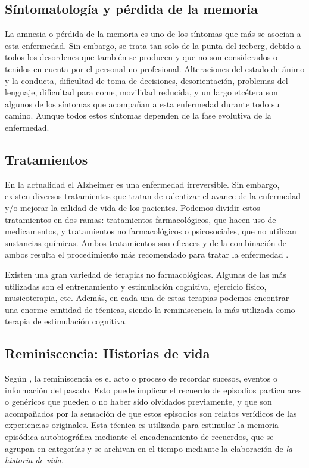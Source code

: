 \subsection{Síntomatología y pérdida de la memoria}
La amnesia o pérdida de la memoria es uno de los síntomas que más se asocian a esta enfermedad. Sin embargo, se trata tan solo de la punta del iceberg, debido a todos los desordenes que también se producen y que no son considerados o tenidos en cuenta por el personal no profesional.  Alteraciones del estado de ánimo y la conducta, dificultad de toma de decisiones, desorientación, problemas del lenguaje, dificultad para come, movilidad reducida, y un largo etcétera son algunos de los síntomas que acompañan a esta enfermedad durante todo su camino. Aunque todos estos síntomas dependen de la fase evolutiva de la enfermedad.


\subsection{Tratamientos}
En la actualidad el Alzheimer es una enfermedad irreversible. Sin embargo, existen diversos tratamientos que tratan de ralentizar el avance de la enfermedad y/o mejorar la calidad de vida de los pacientes. Podemos dividir estos tratamientos en dos ramas: tratamientos farmacológicos, que hacen uso de medicamentos, y tratamientos no farmacológicos o psicosociales, que no utilizan sustancias químicas. Ambos tratamientos son eficaces y de la combinación de ambos resulta el procedimiento más recomendado para tratar la enfermedad \citep{romano2007enfermedad}.


Existen una gran variedad de terapias no farmacológicas. Algunas de las más utilizadas son el entrenamiento y estimulación cognitiva, ejercicio físico, musicoterapia, etc. Además, en cada una de estas terapias podemos encontrar una enorme cantidad de técnicas, siendo la reminiscencia la más utilizada como terapia de estimulación cognitiva.


\subsection{Reminiscencia: Historias de vida}
Según \cite{o2013cross}, la reminiscencia es el acto o proceso de recordar sucesos, eventos o información del pasado. Esto puede implicar el recuerdo de episodios particulares o genéricos que pueden o no haber sido olvidados previamente, y que son acompañados por la sensación de que estos episodios son relatos verídicos de las experiencias originales. Esta técnica es utilizada para estimular la memoria episódica autobiográfica mediante el encadenamiento de recuerdos, que se agrupan en categorías y se archivan en el tiempo mediante la elaboración de \textit{la historia de vida}.

